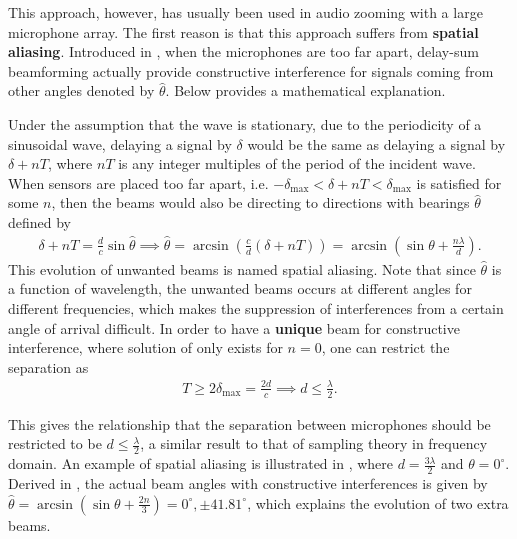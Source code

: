 \documentclass[a4paper,twoside,12pt,hidelinks]{article}
\begin{document}
This approach, however, has usually been used in audio zooming with a large microphone array. The first reason is that this approach suffers from \textbf{spatial aliasing}. Introduced in \cite{Hinich1978ProcessingAliased-arrays}, when the microphones are too far apart, delay-sum beamforming actually provide constructive interference for signals coming from other angles denoted by $\hat{\theta}$. Below provides a mathematical explanation.

Under the assumption that the wave is stationary, due to the periodicity of a sinusoidal wave, delaying a signal by $\delta$ would be the same as delaying a signal by $\delta+nT$, where $nT$ is any integer multiples of the period of the incident wave. When sensors are placed too far apart, i.e. $-\delta_\text{max}<\delta+nT<\delta_\text{max}$ is satisfied for some $n$, then the beams would also be directing to directions with bearings $\hat{\theta}$ defined by 
\begin{align}
\delta+nT = \frac{d}{c} \sin\hat{\theta} \implies \hat{\theta} = \arcsin\left(\frac{c}{d}\left(\delta+nT\right)\right) = \arcsin\left(\sin\theta +\frac{n\lambda}{d}\right). \label{eq:spatialaliasing}
\end{align}
This evolution of unwanted beams is named spatial aliasing. Note that since $\hat{\theta}$ is a function of wavelength, the unwanted beams occurs at different angles for different frequencies, which makes the suppression of interferences from a certain angle of arrival difficult. In order to have a \textbf{unique} beam for constructive interference, where solution of  only exists for $n=0$, one can restrict the separation as
\begin{align}
T \geq 2\delta_\text{max} = \frac{2d}{c} \implies d\leq\frac{\lambda}{2}. \label{eq:spatial2d}
\end{align}

This gives the relationship that the separation between microphones should be restricted to be $d\leq\frac{\lambda}{2}$, a similar result to that of sampling theory in frequency domain. An example of spatial aliasing is illustrated in , where $d = \frac{3\lambda}{2}$ and $\theta=0^\circ$. Derived in , the actual beam angles with constructive interferences is given by $\hat{\theta} = \arcsin\left(\sin\theta +\frac{2n}{3}\right)= 0^\circ,\pm41.81^\circ$, which explains the evolution of two extra beams.
\end{document}
